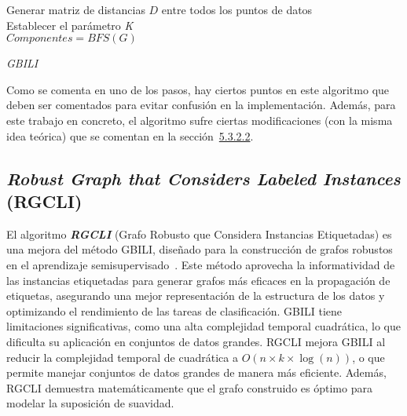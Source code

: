 \begin{algorithm}[H]
\scriptsize
	\label{alg:Gbili}
	\BlankLine
	Generar matriz de distancias $D$ entre todos los puntos de datos\\
	Establecer el parámetro \textit{K}\\
	$Componentes = BFS(G)$\\
	\caption{\textit{GBILI}}
\end{algorithm}

Como se comenta en uno de los pasos, hay ciertos puntos en este algoritmo que deben ser comentados para evitar confusión en la implementación. Además, para este trabajo en concreto, el algoritmo sufre ciertas modificaciones (con la misma idea teórica) que se comentan en la sección~\hyperref[sec5:gbili]{5.3.2.2}.
\clearpage
\subsection{\textit{Robust Graph that Considers Labeled Instances} (RGCLI)}\label{sec3:rgcli}
El algoritmo \textbf{\textit{RGCLI}} (Grafo Robusto que Considera Instancias Etiquetadas) es una mejora del método GBILI, diseñado para la construcción de grafos robustos en el aprendizaje semisupervisado~\cite{rgcli}. Este método aprovecha la informatividad de las instancias etiquetadas para generar grafos más eficaces en la propagación de etiquetas, asegurando una mejor representación de la estructura de los datos y optimizando el rendimiento de las tareas de clasificación. GBILI tiene limitaciones significativas, como una alta complejidad temporal cuadrática, lo que dificulta su aplicación en conjuntos de datos grandes. RGCLI mejora GBILI al reducir la complejidad temporal de cuadrática a $O(n \times k \times \log(n))$, o que permite manejar conjuntos de datos grandes de manera más eficiente. Además, RGCLI demuestra matemáticamente que el grafo construido es óptimo para modelar la suposición de suavidad.

